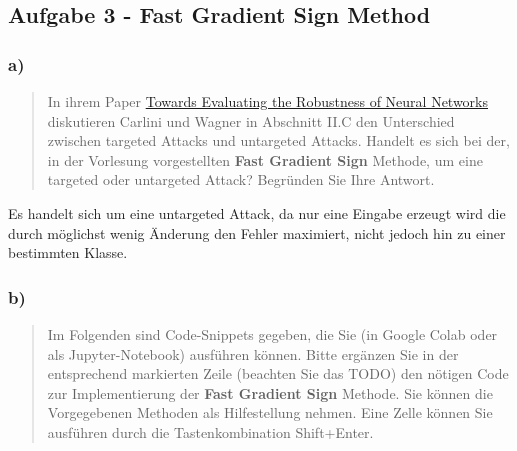 \documentclass[11pt]{article}
\begin{document}
    \hypertarget{aufgabe-3---fast-gradient-sign-method}{%
\subsection{Aufgabe 3 - Fast Gradient Sign
Method}\label{aufgabe-3---fast-gradient-sign-method}}

\hypertarget{a}{%
\subsubsection{a)}\label{a}}

\begin{quote}
In ihrem Paper
\href{https://ieeexplore.ieee.org/abstract/document/7958570}{Towards
Evaluating the Robustness of Neural Networks} diskutieren Carlini und
Wagner in Abschnitt II.C den Unterschied zwischen targeted Attacks und
untargeted Attacks. Handelt es sich bei der, in der Vorlesung
vorgestellten \textbf{Fast Gradient Sign} Methode, um eine targeted oder
untargeted Attack? Begründen Sie Ihre Antwort.
\end{quote}

Es handelt sich um eine untargeted Attack, da nur eine Eingabe erzeugt
wird die durch möglichst wenig Änderung den Fehler maximiert, nicht
jedoch hin zu einer bestimmten Klasse.

\hypertarget{b}{%
\subsubsection{b)}\label{b}}

\begin{quote}
Im Folgenden sind Code-Snippets gegeben, die Sie (in Google Colab oder
als Jupyter-Notebook) ausführen können. Bitte ergänzen Sie in der
entsprechend markierten Zeile (beachten Sie das TODO) den nötigen Code
zur Implementierung der \textbf{Fast Gradient Sign} Methode. Sie können
die Vorgegebenen Methoden als Hilfestellung nehmen. Eine Zelle können
Sie ausführen durch die Tastenkombination Shift+Enter.
\end{quote}
\end{document}
